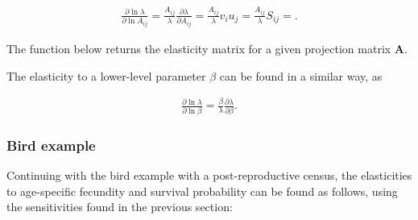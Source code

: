 \documentclass[
]{book}
\newenvironment{Shaded}{\begin{snugshade}}{\end{snugshade}}
\newcommand{\AttributeTok}[1]{\textcolor[rgb]{0.77,0.63,0.00}{#1}}
\newcommand{\ControlFlowTok}[1]{\textcolor[rgb]{0.13,0.29,0.53}{\textbf{#1}}}
\newcommand{\DecValTok}[1]{\textcolor[rgb]{0.00,0.00,0.81}{#1}}
\newcommand{\FunctionTok}[1]{\textcolor[rgb]{0.00,0.00,0.00}{#1}}
\newcommand{\NormalTok}[1]{#1}
\newcommand{\OtherTok}[1]{\textcolor[rgb]{0.56,0.35,0.01}{#1}}
\newcommand{\SpecialCharTok}[1]{\textcolor[rgb]{0.00,0.00,0.00}{#1}}
\begin{document}
\begin{align} 
\frac{\partial  \ln \lambda}{\partial \ln A_{ij}} =\frac{A_{ij}}{\lambda}\frac{\partial  \lambda}{\partial A_{ij}}=\frac{A_{ij}}{\lambda} v_{i}u_{j}=\frac{A_{ij}}{\lambda} S_{ij}=.
\end{align}

The function below returns the elasticity matrix for a given projection matrix \(\mathbf{A}\).

\begin{Shaded}
\end{Shaded}

The elasticity to a lower-level parameter \(\beta\) can be found in a similar way, as

\begin{align} 
\frac{\partial  \ln \lambda}{\partial \ln \beta} =\frac{\beta}{\lambda}\frac{\partial  \lambda}{\partial \beta}.
\end{align}

\hypertarget{bird-example-13}{%
\subsubsection*{Bird example}\label{bird-example-13}}

Continuing with the bird example with a post-reproductive census, the elasticities to age-specific fecundity and survival probability can be found as follows, using the sensitivities found in the previous section:
\end{document}
